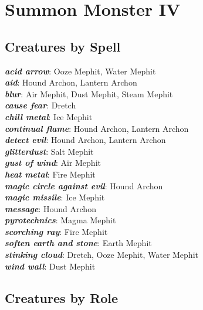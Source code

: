 \newpage

\def \levelnminustwonumsummons{1d4+1}
\def \levelnminusonenumsummons{1d3}
\def \levelnnumsummons{1}

\chapter{Summon Monster IV}
\newpage

\section{Creatures by Spell}

\vspace{10pt}

\textbf{\textit{acid arrow}}: Ooze Mephit, Water Mephit \\
\textbf{\textit{aid}}: Hound Archon, Lantern Archon \\
\textbf{\textit{blur}}: Air Mephit, Dust Mephit, Steam Mephit \\
\textbf{\textit{cause fear}}: Dretch \\
\textbf{\textit{chill metal}}: Ice Mephit \\
\textbf{\textit{continual flame}}: Hound Archon, Lantern Archon \\
\textbf{\textit{detect evil}}: Hound Archon, Lantern Archon \\
\textbf{\textit{glitterdust}}: Salt Mephit \\
\textbf{\textit{gust of wind}}: Air Mephit \\
\textbf{\textit{heat metal}}: Fire Mephit \\
\textbf{\textit{magic circle against evil}}: Hound Archon \\
\textbf{\textit{magic missile}}: Ice Mephit \\
\textbf{\textit{message}}: Hound Archon \\
\textbf{\textit{pyrotechnics}}: Magma Mephit \\
\textbf{\textit{scorching ray}}: Fire Mephit \\
\textbf{\textit{soften earth and stone}}: Earth Mephit \\
\textbf{\textit{stinking cloud}}: Dretch, Ooze Mephit, Water Mephit \\
\textbf{\textit{wind wall}}: Dust Mephit \\

\newpage

\section{Creatures by Role}

